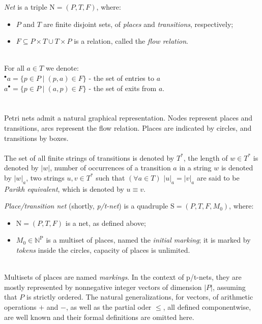 \documentclass[a4paper]{llncs}
\begin{document}
\begin{definition}[Nets]
\label{d21}
\emph{Net} is a triple $\mathrm{N}=(P,T,F)$, where:
\begin{itemize}
\item $P$ and $T$ are finite disjoint sets, of \emph{places} and \emph{transitions}, respectively;
\item $F\subseteq P\times T \cup T \times P$ is a relation, called the \emph{flow relation}.
\end{itemize}
\end{definition}\mbox{ }\\
\indent For all $a\in T$ we denote:\\
\indent$^\bullet a = \{p \in P \mid (p,a) \in F\}$  -  the set of entries to $a$\\
\indent$a^\bullet = \{p \in P \mid (a,p) \in F\}$  -  the set of exits from $a$.\\
\\ \\
\newpage
Petri nets admit a natural graphical representation. Nodes represent places and transitions, arcs represent the flow relation. Places are indicated by circles, and transitions by boxes.
\\ \\
The set of all finite strings of transitions is denoted by $T^*$, the length of $w\in T^*$ is denoted by $|w|$, number of occurrences of a transition $a$ in a string $w$ is denoted by $|w|_a$, two strings $u,v \in T^*$ such that $(\forall a\in T)$ $|u|_a=|v|_a$ are said to be \emph{Parikh equivalent}, which is denoted by $u\equiv v$.
\\
\begin{definition}
\label{d22}
\emph{Place/transition net} (shortly, \emph{p/t-net}) is a quadruple $\mathrm{S}=(P,T,F,M_0)$, where:
\begin{itemize}
\item $\mathrm{N}=(P,T,F)$ is a net, as defined above;
\item $M_0 \in \mathbb{N}^\mathrm{P}$ is a multiset of places, named the \emph{initial marking}; it is marked by \emph{tokens} inside the circles, capacity of places is unlimited.
\end{itemize}
\end{definition}\mbox{ }\\
Multisets of places are named \emph{markings}. In the context of p/t-nets, they are mostly represented by nonnegative integer vectors of dimension $|P|$, assuming that $P$ is strictly ordered. The natural generalizations, for vectors, of arithmetic operations $+$ and $-$, as well as the partial oder $ \leqslant$, all defined componentwise, are well known and their formal definitions are omitted here.
\end{document}
